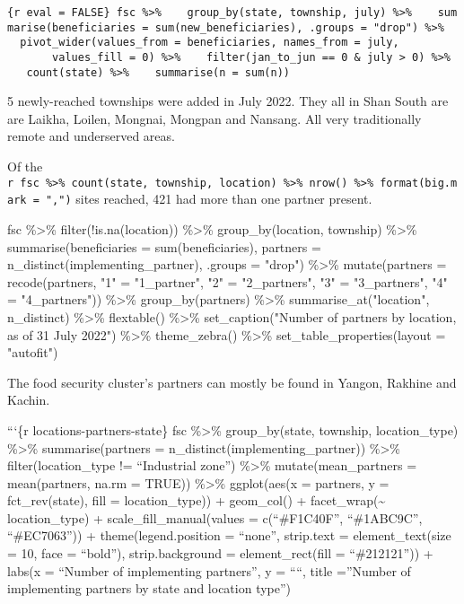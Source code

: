 \documentclass[
]{article}
\newenvironment{Shaded}{\begin{snugshade}}{\end{snugshade}}
\newcommand{\NormalTok}[1]{#1}
\begin{document}
\texttt{\{r\ eval\ =\ FALSE\}\ fsc\ \%\textgreater{}\%\ \ \ \ group\_by(state,\ township,\ july)\ \%\textgreater{}\%\ \ \ \ summarise(beneficiaries\ =\ sum(new\_beneficiaries),\ .groups\ =\ "drop")\ \%\textgreater{}\%\ \ \ \ pivot\_wider(values\_from\ =\ beneficiaries,\ names\_from\ =\ july,\ \ \ \ \ \ \ \ \ \ \ \ \ \ \ \ values\_fill\ =\ 0)\ \%\textgreater{}\%\ \ \ \ filter(jan\_to\_jun\ ==\ 0\ \&\ july\ \textgreater{}\ 0)\ \%\textgreater{}\%\ \ \ \ count(state)\ \%\textgreater{}\%\ \ \ \ summarise(n\ =\ sum(n))}

5 newly-reached townships were added in July 2022. They all in Shan
South are are Laikha, Loilen, Mongnai, Mongpan and Nansang. All very
traditionally remote and underserved areas.

Of the
\texttt{r\ fsc\ \%\textgreater{}\%\ count(state,\ township,\ location)\ \%\textgreater{}\%\ nrow()\ \%\textgreater{}\%\ format(big.mark\ =\ ",")}
sites reached, 421 had more than one partner present.

\begin{Shaded}
\begin{Highlighting}[]
\NormalTok{fsc \%\textgreater{}\% }
\NormalTok{  filter(!is.na(location)) \%\textgreater{}\% }
\NormalTok{  group\_by(location, township) \%\textgreater{}\%  }
\NormalTok{  summarise(beneficiaries = sum(beneficiaries), }
\NormalTok{            partners = n\_distinct(implementing\_partner), .groups = "drop") \%\textgreater{}\%}
\NormalTok{  mutate(partners = recode(partners, }
\NormalTok{                           "1" = "1\_partner", }
\NormalTok{                           "2" = "2\_partners", }
\NormalTok{                           "3" = "3\_partners", }
\NormalTok{                           "4" = "4\_partners")) \%\textgreater{}\% }
\NormalTok{  group\_by(partners) \%\textgreater{}\% }
\NormalTok{  summarise\_at("location", n\_distinct) \%\textgreater{}\%  }
\NormalTok{  flextable() \%\textgreater{}\% }
\NormalTok{  set\_caption("Number of partners by location, as of 31 July 2022") \%\textgreater{}\% }
\NormalTok{  theme\_zebra() \%\textgreater{}\% }
\NormalTok{  set\_table\_properties(layout = "autofit") }
\end{Highlighting}
\end{Shaded}

The food security cluster's partners can mostly be found in Yangon,
Rakhine and Kachin.

```\{r locations-partners-state\} fsc \%\textgreater\% group\_by(state,
township, location\_type) \%\textgreater\% summarise(partners =
n\_distinct(implementing\_partner)) \%\textgreater\%
filter(location\_type != ``Industrial zone'') \%\textgreater\%
mutate(mean\_partners = mean(partners, na.rm = TRUE)) \%\textgreater\%
ggplot(aes(x = partners, y = fct\_rev(state), fill = location\_type)) +
geom\_col() + facet\_wrap(\textasciitilde{} location\_type) +
scale\_fill\_manual(values = c(``\#F1C40F'', ``\#1ABC9C'',
``\#EC7063'')) + theme(legend.position = ``none'', strip.text =
element\_text(size = 10, face = ``bold''), strip.background =
element\_rect(fill = ``\#212121'')) + labs(x = ``Number of implementing
partners'', y = ````, title =''Number of implementing partners by state
and location type'')
\end{document}
